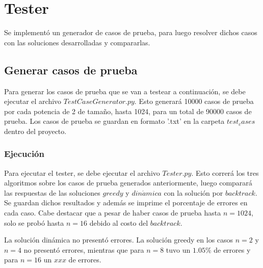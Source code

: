 \documentclass{article}
\begin{document}
\section*{Tester}

Se implementó un generador de casos de prueba, para luego resolver dichos casos con las 
soluciones desarrolladas y compararlas.
\subsection*{Generar casos de prueba}

Para generar los casos de prueba que se van a testear a continuación, se debe ejecutar el archivo 
$TestCaseGenerator.py$. Esto generará 10000 casos de prueba por cada potencia de 2 de tamaño, hasta 1024, 
para un total de 90000 casos de prueba. Los casos de prueba se guardan en formato '.txt' en la carpeta 
$test_cases$ dentro del proyecto.

\subsubsection*{Ejecución}
Para ejecutar el tester, se debe ejecutar el archivo $Tester.py$. Esto correrá los tres algoritmos sobre los 
casos de prueba generados anteriormente, luego comparará las respuestas de las soluciones $greedy$ y 
$din\acute{a}mica$ con la solución por $backtrack$. Se guardan dichos resultados y además se imprime 
el porcentaje de errores en cada caso. Cabe destacar que a pesar de haber casos de prueba hasta $n = 1024$, 
solo se probó hasta $n = 16$ debido al costo del $backtrack$.

La solución dinámica no presentó errores. La solución greedy en los casos $n=2$ y $n=4$ no presentó errores, mientras
que para $n=8$ tuvo un $1.05\%$ de errores y para $n=16$ un $xxx$ de errores.
\end{document}
